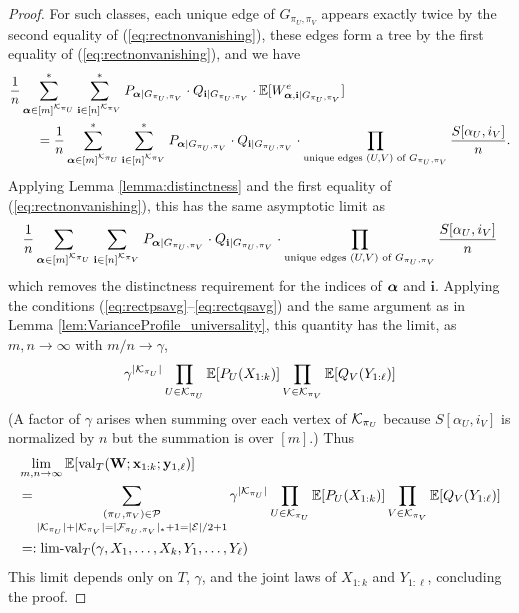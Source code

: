 \documentclass[10pt,reqno]{amsart}
\def\x{\mathbf{x}}
\def\y{\mathbf{y}}
\def\W{\mathbf{W}}
\def\E{\mathbb{E}}
\def\cE{\mathcal{E}}
\def\val{\operatorname{val}}
\def\limval{\operatorname{lim-val}}
\def\bi{\mathbf{i}}
\begin{document}
\begin{proof}
For such classes, each unique edge of $G_{\pi_U,\pi_V}$ appears exactly twice by
the second equality of (\ref{eq:rectnonvanishing}),
these edges form a tree by the first equality of (\ref{eq:rectnonvanishing}),
and we have
\begin{align*}
&\frac{1}{n} \sum_{\balpha \in [m]^{\cK_{\pi_U}}}^* \sum_{\bi \in
[n]^{\cK_{\pi_V}}}^* P_{\balpha|G_{\pi_U,\pi_V}} \cdot Q_{\bi|G_{\pi_U,\pi_V}}
\cdot \E[W_{\balpha,\bi|G_{\pi_U,\pi_V}}^e]\\
&\qquad=\frac{1}{n} \sum_{\balpha \in [m]^{\cK_{\pi_U}}}^* \sum_{\bi \in
[n]^{\cK_{\pi_V}}}^* P_{\balpha|G_{\pi_U,\pi_V}} \cdot Q_{\bi|G_{\pi_U,\pi_V}}
\cdot \prod_{\text{unique edges } (U,V) \text{ of } G_{\pi_U,\pi_V}}
\frac{S[\alpha_U,i_V]}{n}.
\end{align*}
Applying Lemma \ref{lemma:distinctness} and the first equality of
(\ref{eq:rectnonvanishing}), this has the same asymptotic limit as 
\[\frac{1}{n} \sum_{\balpha \in [m]^{\cK_{\pi_U}}} \sum_{\bi \in
[n]^{\cK_{\pi_V}}} P_{\balpha|G_{\pi_U,\pi_V}} \cdot Q_{\bi|G_{\pi_U,\pi_V}}
\cdot \prod_{\text{unique edges } (U,V) \text{ of } G_{\pi_U,\pi_V}}
\frac{S[\alpha_U,i_V]}{n}\]
which removes the distinctness requirement for the indices of $\bm{\alpha}$ and
$\bi$. Applying the conditions
(\ref{eq:rectpsavg}--\ref{eq:rectqsavg}) and the same argument as in
Lemma \ref{lem:VarianceProfile_universality}, this quantity has
the limit, as $m,n \to \infty$ with $m/n \to \gamma$,
\[\gamma^{|\cK_{\pi_U}|} \prod_{U \in \cK_{\pi_U}} \E[P_U(X_{1:k})]
\prod_{V \in \cK_{\pi_V}} \E[Q_V(Y_{1:\ell})]\]
(A factor of $\gamma$ arises when summing over each vertex of
$\mathcal{K}_{\pi_U}$ because $S[\alpha_U,i_V]$ is normalized by $n$ but the
summation is over $[m]$.) Thus
\begin{align*}
&\lim_{m,n \to \infty} \E[\val_T(\W;\x_{1:k};\y_{1,\ell})]\\
&=\mathop{\sum_{(\pi_U,\pi_V) \in \cP}}_{|\cK_{\pi_U}|+|\cK_{\pi_V}|
=|\cF_{\pi_U,\pi_V}|_*+1=|\cE|/2+1}
\gamma^{|\cK_{\pi_U}|} \prod_{U \in \cK_{\pi_U}} \E[P_U(X_{1:k})]
\prod_{V \in \cK_{\pi_V}} \E[Q_V(Y_{1:\ell})]\\
&=:\limval_T(\gamma,X_1,\ldots,X_k,Y_1,\ldots,Y_\ell)
\end{align*}
This limit depends only on $T$, $\gamma$, and the joint laws of $X_{1:k}$ and
$Y_{1:\ell}$, concluding the proof.
\end{proof}
\end{document}
